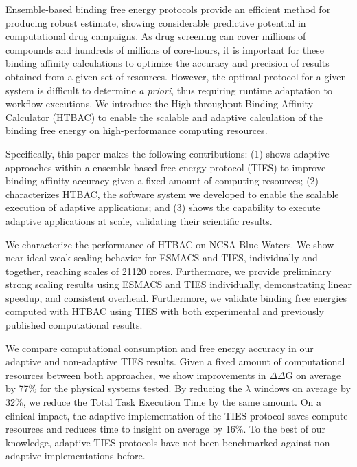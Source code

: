 Ensemble-based binding free energy protocols provide an efficient method for
producing robust estimate, showing considerable predictive potential in
computational drug campaigns. As drug screening can cover millions of
compounds and hundreds of millions of core-hours, it is important for these
binding affinity calculations to optimize the accuracy and precision of
results obtained from a given set of resources. However, the optimal protocol
for a given system is difficult to determine {\it a priori}, thus requiring
runtime adaptation to workflow executions. We introduce the High-throughput
Binding Affinity Calculator (HTBAC) to enable the scalable and adaptive
calculation of the binding free energy on high-performance computing
resources.


Specifically, this paper makes the following contributions: (1) shows
adaptive approaches within a ensemble-based free energy protocol (TIES) to
improve binding affinity accuracy given a fixed amount of computing
resources; (2) characterizes HTBAC, the software system we developed to
enable the scalable execution of adaptive applications; and (3) shows the
capability to execute adaptive applications at scale, validating their
scientific results.

We characterize the performance of HTBAC on NCSA Blue Waters. We show
near-ideal weak scaling behavior for ESMACS and TIES, individually and
together, reaching scales of 21120 cores. Furthermore, we provide preliminary
strong scaling results using ESMACS and TIES individually, demonstrating
linear speedup, and consistent overhead. Furthermore, we validate binding
free energies computed with HTBAC using TIES with both experimental and
previously published computational results.


We compare computational consumption and free energy accuracy in our adaptive
and non-adaptive TIES results. Given a fixed amount of computational
resources between both approaches, we show improvements in $\Delta \Delta$G
on average by 77\% for the physical systems tested. By reducing the $\lambda$
windows on average by 32\%, we reduce the Total Task Execution Time by the
same amount. On a clinical impact, the adaptive implementation of the TIES
protocol saves compute resources and reduces time to insight on average by
16\%. To the best of our knowledge, adaptive TIES protocols have not been
benchmarked against non-adaptive implementations before.


